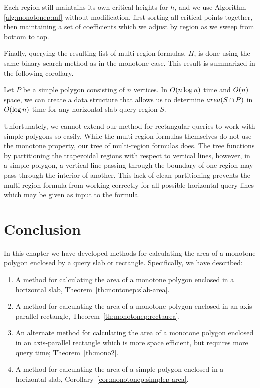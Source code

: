 Each region still maintains its own critical heights for $h$, and we use Algorithm \ref{alg:monotonep:mf} without modification, first sorting all critical points together, then maintaining a set of coefficients which we adjust by region as we sweep from bottom to top.

Finally, querying the resulting list of multi-region formulas, $H$, is done using the same binary search method as in the monotone case. This result is summarized in the following corollary.

\begin{corollary}
\label{cor:monotonep:simplep-area}
Let $P$ be a simple polygon consisting of $n$ vertices. In $O\!\left(n \log{n}\right)$ time and $O\!\left(n\right)$ space, we can create a data structure that allows us to determine $area(S \cap P)$ in $O\!\left(\log{n}\right)$ time for any horizontal slab query region $S$.
\end{corollary}

Unfortunately, we cannot extend our method for rectangular queries to work with simple polygons so easily.
While the multi-region formulas themselves do not use the monotone property, our tree of multi-region formulas does. 
The tree functions by partitioning the trapezoidal regions with respect to vertical lines, however, in a simple polygon, a vertical line passing through the boundary of one region may pass through the interior of another. 
This lack of clean partitioning prevents the multi-region formula from working correctly for all possible horizontal query lines which may be given as input to the formula.

\section{Conclusion}
\label{:monotonep:concl}

In this chapter we have developed methods for calculating the area of a monotone polygon enclosed by a query slab or rectangle.  Specifically, we have described:

\begin{enumerate}
\item A method for calculating the area of a monotone polygon enclosed in a horizontal slab, Theorem~\ref{th:montonep:slab-area}.

\item A method for calculating the area of a monotone polygon enclosed in an axis-parallel rectangle, Theorem~\ref{th:monotonep:rect:area}.

\item An alternate method for calculating the area of a monotone polygon enclosed in an axis-parallel rectangle which is more space efficient, but requires more query time; Theorem~\ref{th:mono2}.

\item A method for calculating the area of a simple polygon enclosed in a horizontal slab, Corollary~\ref{cor:monotonep:simplep-area}.

\end{enumerate}

